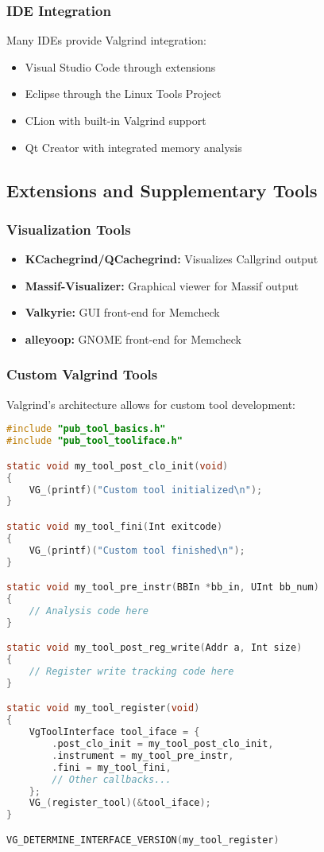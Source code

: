 \documentclass[11pt,a4paper]{article}
\begin{document}
\subsubsection{IDE Integration}
Many IDEs provide Valgrind integration:
\begin{itemize}
    \item Visual Studio Code through extensions
    \item Eclipse through the Linux Tools Project
    \item CLion with built-in Valgrind support
    \item Qt Creator with integrated memory analysis
\end{itemize}

\subsection{Extensions and Supplementary Tools}

\subsubsection{Visualization Tools}
\begin{itemize}
    \item \textbf{KCachegrind/QCachegrind:} Visualizes Callgrind output
    \item \textbf{Massif-Visualizer:} Graphical viewer for Massif output
    \item \textbf{Valkyrie:} GUI front-end for Memcheck
    \item \textbf{alleyoop:} GNOME front-end for Memcheck
\end{itemize}

\subsubsection{Custom Valgrind Tools}
Valgrind's architecture allows for custom tool development:

\begin{lstlisting}[caption=Basic structure of a custom Valgrind tool, language=C]
#include "pub_tool_basics.h"
#include "pub_tool_tooliface.h"

static void my_tool_post_clo_init(void)
{
    VG_(printf)("Custom tool initialized\n");
}

static void my_tool_fini(Int exitcode)
{
    VG_(printf)("Custom tool finished\n");
}

static void my_tool_pre_instr(BBIn *bb_in, UInt bb_num)
{
    // Analysis code here
}

static void my_tool_post_reg_write(Addr a, Int size)
{
    // Register write tracking code here
}

static void my_tool_register(void)
{
    VgToolInterface tool_iface = {
        .post_clo_init = my_tool_post_clo_init,
        .instrument = my_tool_pre_instr,
        .fini = my_tool_fini,
        // Other callbacks...
    };
    VG_(register_tool)(&tool_iface);
}

VG_DETERMINE_INTERFACE_VERSION(my_tool_register)
\end{lstlisting}
\end{document}
